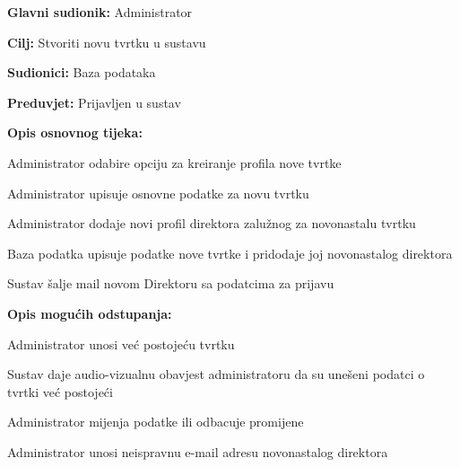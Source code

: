 					
					\noindent {}
					\begin{packed_item}
						
						\item \textbf{Glavni sudionik: }Administrator
						\item  \textbf{Cilj:} Stvoriti novu tvrtku u sustavu
						\item  \textbf{Sudionici:} Baza podataka
						\item  \textbf{Preduvjet:} Prijavljen u sustav
						\item  \textbf{Opis osnovnog tijeka:}
						
						\item[] \begin{packed_enum}
							
							\item Administrator odabire opciju za kreiranje profila nove tvrtke
							\item Administrator upisuje osnovne podatke za novu tvrtku
							\item Administrator dodaje novi profil direktora zalužnog za novonastalu tvrtku
							\item Baza podatka upisuje podatke nove tvrtke i pridodaje joj novonastalog direktora
							\item Sustav šalje mail novom Direktoru sa podatcima za prijavu
							
						\end{packed_enum}
						
						\item  \textbf{Opis mogućih odstupanja:}
						
						\item[] \begin{packed_item}
							
							\item[4.a] Administrator unosi već postojeću tvrtku
							\item[] \begin{packed_enum}
								
								\item Sustav daje audio-vizualnu obavjest administratoru da su unešeni podatci o tvrtki već postojeći
								\item Administrator mijenja podatke ili odbacuje promijene
								
							\end{packed_enum}
							
							\item[4.b] Administrator unosi neispravnu e-mail adresu novonastalog direktora
							\item[] \begin{packed_enum}
								

\end{packed_enum}
\end{packed_item}
\end{packed_item}
